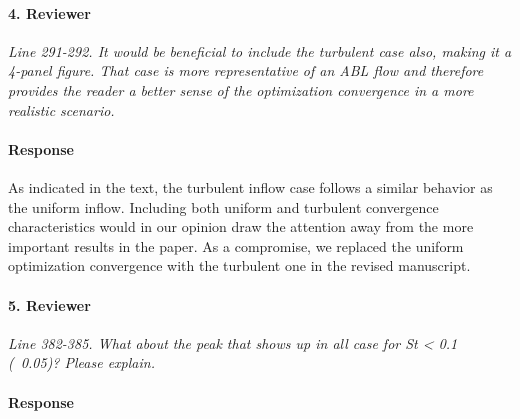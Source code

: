 \documentclass[]{article}
\begin{document}
\hrulefill

\paragraph{4. Reviewer} \textit{Line 291-292. It would be beneficial to include the turbulent case also, making it a 4-panel figure. That case is more representative of an ABL flow and therefore provides the reader a better sense of the optimization convergence in a more realistic scenario.}

\paragraph{Response} As indicated in the text, the turbulent inflow case follows a similar behavior as the uniform inflow. Including both uniform and turbulent convergence characteristics would in our opinion draw the attention away from the more important results in the paper. As a compromise, we replaced the uniform optimization convergence with the turbulent one in the revised manuscript. 

\hrulefill

\paragraph{5. Reviewer} \textit{Line 382-385. What about the peak that shows up in all case for St < 0.1 (~0.05)? Please explain.}

\paragraph{Response} 


\hrulefill
\end{document}
